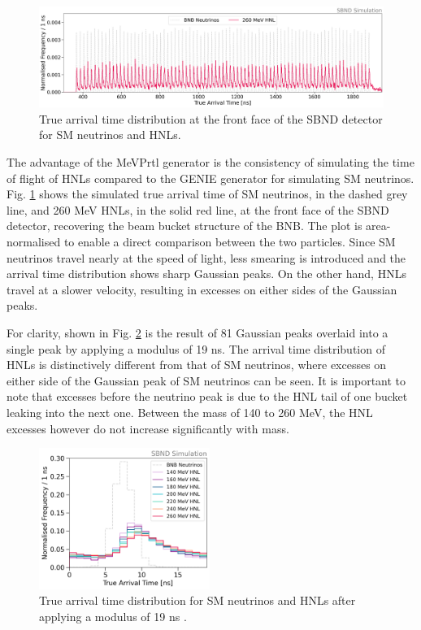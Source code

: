 \begin{figure}[b!] 
\centering    
\includegraphics[width=1.0\textwidth]{full_beam}
\caption[Arrival Time of SM Neutrinos and HNLs at the Front Face of SBND]{
True arrival time distribution at the front face of the SBND detector for SM neutrinos and HNLs. 
}
\label{fig:full_beam}
\end{figure}

The advantage of the MeVPrtl generator is the consistency of simulating the time of flight of HNLs compared to the GENIE generator \cite{genie} for simulating SM neutrinos.
Fig. \ref{fig:full_beam} shows the simulated true arrival time of SM neutrinos, in the dashed grey line, and 260 MeV HNLs, in the solid red line, at the front face of the SBND detector, recovering the beam bucket structure of the BNB.
The plot is area-normalised to enable a direct comparison between the two particles. 
Since SM neutrinos travel nearly at the speed of light, less smearing is introduced and the arrival time distribution shows sharp Gaussian peaks.
On the other hand, HNLs travel at a slower velocity, resulting in excesses on either sides of the Gaussian peaks.

For clarity, shown in Fig. \ref{fig:beam_modulus} is the result of 81 Gaussian peaks overlaid into a single peak by applying a modulus of 19 ns.
The arrival time distribution of HNLs is distinctively different from that of SM neutrinos, where excesses on either side of the Gaussian peak of SM neutrinos can be seen.
It is important to note that excesses before the neutrino peak is due to the HNL tail of one bucket leaking into the next one.
Between the mass of 140 to 260 MeV, the HNL excesses however do not increase significantly with mass.

\begin{figure}[ht!] 
\vspace{0.5cm}
\centering    
\includegraphics[width=0.495\textwidth]{beam_modulus}
\caption[Modulus of the Arrival Time Distibutions of SM Neutrinos and HNLs]{
True arrival time distribution for SM neutrinos and HNLs after applying a modulus of 19 ns . 
}
\label{fig:beam_modulus}
\end{figure}

